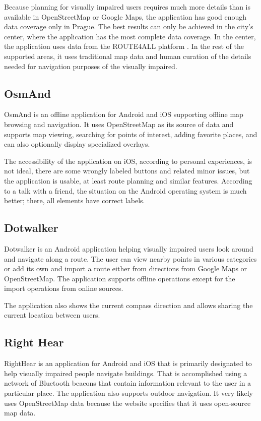\documentclass[nolof,digital]{fithesis3}
\begin{document}
Because planning for visually impaired users requires much more details than is available in OpenStreetMap or Google Maps, the application has good enough data coverage only in Prague. The best results can only be achieved in the city's center, where the application has the most complete data coverage. In the center, the application uses data from the ROUTE4ALL platform \parencite{route4all}. In the rest of the supported areas, it uses traditional map data and human curation of the details needed for navigation purposes of the visually impaired.
\subsection{OsmAnd}
OsmAnd \parencite{osmand} is an offline application for Android and iOS supporting offline map browsing and navigation. It uses OpenStreetMap as its source of data and supports map viewing, searching for points of interest, adding favorite places, and can also optionally display specialized overlays.

The accessibility of the application on iOS, according to personal experiences, is not ideal, there are some wrongly labeled buttons and related minor issues, but the application is usable, at least route planning and similar features. According to a talk with a friend, the situation on the Android operating system is much better; there, all elements have correct labels.
\subsection{Dotwalker}
Dotwalker \parencite{dotwalker} is an Android application helping visually impaired users look around and navigate along a route. The user can view nearby points in various categories or add its own and import a route either from directions from Google Maps or OpenStreetMap. The application supports offline operations except for the import operations from online sources.

The application also shows the current compass direction and allows sharing the current location between users.
\subsection{Right Hear}
RightHear \parencite{righthear} is an application for Android and iOS that is primarily designated to help visually impaired people navigate buildings. That is accomplished using a network of Bluetooth beacons that contain information relevant to the user in a particular place. The application also supports outdoor navigation. It very likely uses OpenStreetMap data because the website specifies that it uses open-source map data.
\end{document}
